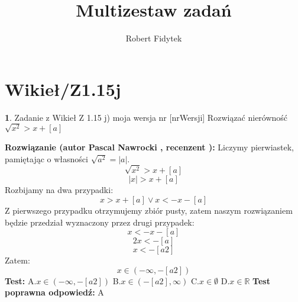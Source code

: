 \documentclass[12pt, a4paper]{article}
\title{Multizestaw zadań}
\author{Robert Fidytek}
\date{}
\theoremstyle{definition} %
\newtheorem{zad}{}
\newcommand{\kategoria}[1]{\section{#1}} %
\newcommand{\zadStart}[1]{\begin{zad}#1\newline} %
\newcommand{\zadStop}{\end{zad}}   %
\newcommand{\rozwStart}[2]{\noindent \textbf{Rozwiązanie (autor #1 , recenzent #2): }\newline} %
\newcommand{\odpStop}{\newline}                                             %
\newcommand{\testStart}{\noindent \textbf{Test:}\newline} %
\newcommand{\testStop}{\newline} %
\newcommand{\kluczStart}{\noindent \textbf{Test poprawna odpowiedź:}\newline} %
\newcommand{\kluczStop}{\newline} %
\begin{document}
\maketitle



\kategoria{Wikieł/Z1.15j}
\zadStart{Zadanie z Wikieł Z 1.15 j) moja wersja nr [nrWersji]}
Rozwiązać nierówność $\sqrt{x^2}>x+[a]$
\zadStop
\rozwStart{Pascal Nawrocki}{}
Liczymy pierwiastek, pamiętając o własności $\sqrt{a^2}=|a|$.
$$\sqrt{x^2}>x+[a]$$
$$|x|>x+[a]$$
Rozbijamy na dwa przypadki:
$$x>x+[a] \vee x<-x-[a]$$
Z pierwszego przypadku otrzymujemy zbiór pusty, zatem naszym rozwiązaniem będzie przedział wyznaczony przez drugi przypadek:
$$x<-x-[a]$$
$$2x<-[a]$$
$$x<-[a2]$$
Zatem:
$$x\in(-\infty,-[a2])$$
\odpStop
\testStart
A.$x\in(-\infty,-[a2])$
B.$x\in(-[a2],\infty)$
C.$x\in\emptyset$
D.$x\in\mathbb{R}$
\testStop
\kluczStart
A
\kluczStop
\end{document}
